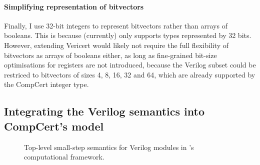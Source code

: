 \paragraph{Simplifying representation of bitvectors} Finally, I use 32-bit
integers to represent bitvectors rather than arrays of booleans. This is because
\vericert{} (currently) only supports types represented by 32 bits.  However,
extending Vericert would likely not require the full flexibility of bitvectors
as arrays of booleans either, as long as fine-grained bit-size optimisations for
registers are not introduced, because the Verilog subset could be restriced to
bitvectors of sizes 4, 8, 16, 32 and 64, which are already supported by the
CompCert integer type.

\subsection{Integrating the Verilog semantics into CompCert's model}
\label{sec:verilog:integrating}

\begin{figure*}
  \centering
  \begin{minipage}{1.0\linewidth}
  \end{minipage}
  \caption{Top-level small-step semantics for Verilog modules in \compcert{}'s computational framework.}%
  \label{fig:inference_module}
\end{figure*}

